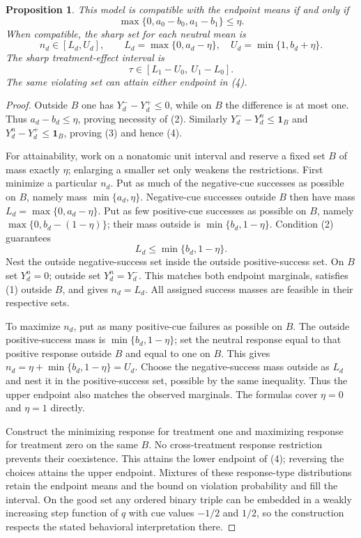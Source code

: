 \documentclass[11pt]{article}
\newtheorem{proposition}{Proposition}
\begin{document}
\begin{proposition}
This model is compatible with the endpoint means if and only if
\[
 \max\{0,a_0-b_0,a_1-b_1\}\le\eta.                       \tag{2}
\]
When compatible, the sharp set for each neutral mean is
\[
 n_d\in[L_d,U_d],\qquad
 L_d=\max\{0,a_d-\eta\},\quad
 U_d=\min\{1,b_d+\eta\}.                                 \tag{3}
\]
The sharp treatment-effect interval is
\[
 \tau\in[L_1-U_0,\ U_1-L_0].                             \tag{4}
\]
The same violating set can attain either endpoint in (4).
\end{proposition}
\begin{proof}
Outside $B$ one has $Y_d^--Y_d^+\le0$, while on $B$ the difference is at
most one. Thus $a_d-b_d\le\eta$, proving necessity of (2).
Similarly $Y_d^--Y_d^n\le\mathbf1_B$ and
$Y_d^n-Y_d^+\le\mathbf1_B$, proving (3) and hence (4).

For attainability, work on a nonatomic unit interval and reserve a fixed
set $B$ of mass exactly $\eta$; enlarging a smaller set only weakens the
restrictions. First minimize a particular $n_d$. Put as much of the
negative-cue successes as possible on $B$, namely mass
$\min\{a_d,\eta\}$. Negative-cue successes outside $B$ then have mass
$L_d=\max\{0,a_d-\eta\}$. Put as few positive-cue successes as possible
on $B$, namely $\max\{0,b_d-(1-\eta)\}$; their mass outside is
$\min\{b_d,1-\eta\}$. Condition (2) guarantees
\[
 L_d\le\min\{b_d,1-\eta\}.
\]
Nest the outside negative-success set inside the outside positive-success
set. On $B$ set $Y_d^n=0$; outside set $Y_d^n=Y_d^-$. This matches both
endpoint marginals, satisfies (1) outside $B$, and gives $n_d=L_d$.
All assigned success masses are feasible in their respective sets.

To maximize $n_d$, put as many positive-cue failures as possible on $B$.
The outside positive-success mass is $\min\{b_d,1-\eta\}$; set the neutral
response equal to that positive response outside $B$ and equal to one on
$B$. This gives $n_d=\eta+\min\{b_d,1-\eta\}=U_d$.
Choose the negative-success mass outside as $L_d$ and nest it in the
positive-success set, possible by the same inequality. Thus the upper
endpoint also matches the observed marginals. The formulas cover
$\eta=0$ and $\eta=1$ directly.

Construct the minimizing response for treatment one and maximizing
response for treatment zero on the same $B$. No cross-treatment response
restriction prevents their coexistence. This attains the lower endpoint
of (4); reversing the choices attains the upper endpoint. Mixtures of
these response-type distributions retain the endpoint means and the bound
on violation probability and fill the interval. On the good set any
ordered binary triple can be embedded in a weakly increasing step function
of $q$ with cue values $-1/2$ and $1/2$, so the construction respects the
stated behavioral interpretation there.
\end{proof}
\end{document}
